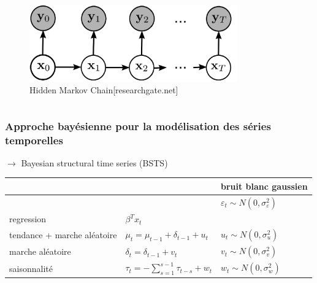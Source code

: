 \begin{frame}
\begin{columns}
        \begin{column}{0.5\textwidth}
            \vspace{0.5cm}
            \begin{figure}
                \includegraphics[width=0.8\textwidth]{Figures/hmc.png}
                \caption{Hidden Markov Chain[researchgate.net]}
            \end{figure}
        \end{column}
    \end{columns}
\end{frame}



\begin{frame}
    \frametitle{Approche bayésienne pour la modélisation des séries temporelles}
    
    $\rightarrow$ Bayesian structural time series (BSTS) 
    \bgroup
    \def\arraystretch{1.5}
\begin{table}[]
    \begin{tabular}{lll}
        &                                                                         & bruit blanc gaussien       \\ \hline
\rowcolor[HTML]{96FFFB} 
\multicolumn{1}{l|}{\cellcolor[HTML]{96FFFB}{\color[HTML]{333333} observation}} & \multicolumn{1}{l|}{\cellcolor[HTML]{96FFFB}{\color[HTML]{333333} $y_{t}=\mu_{t}+\beta^{T} x_{t}+\tau_t +\varepsilon_{t}$}}  & {\color[HTML]{333333} $\varepsilon_{t} \sim N\left(0, \sigma_{\varepsilon}^{2}\right)$} \\ \hline
\multicolumn{1}{l|}{regression}                                                 & \multicolumn{1}{l|}{${\beta^{T} x_{t}}$}                                 &                      \\ \hline
\multicolumn{1}{l|}{tendance + marche aléatoire}                                & \multicolumn{1}{l|}{${\mu_{t}=\mu_{t-1}+\delta_{t-1}+u_{t}}$}            & $u_{t} \sim N\left(0, \sigma_{u}^{2}\right)$                        \\ \hline
\multicolumn{1}{l|}{marche aléatoire}                                           & \multicolumn{1}{l|}{$\delta_{t}=\delta_{t-1}+v_{t}$}                     & $v_{t} \sim N\left(0, \sigma_{v}^{2}\right)$                        \\ \hline
\multicolumn{1}{l|}{saisonnalité}                                              & \multicolumn{1}{l|}{$\tau_{t}=-\sum_{s=1}^{s-1} \tau_{t-s}+w_{t}$}       & $w_{t} \sim N\left(0, \sigma_{w}^{2}\right)$                       
\end{tabular}
\end{table}
\egroup
\end{frame}


